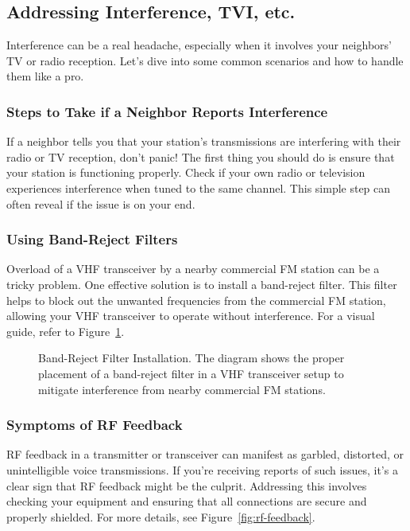 \subsection{Addressing Interference, TVI, etc.}
\label{subsec:interference}

Interference can be a real headache, especially when it involves your neighbors' TV or radio reception. Let's dive into some common scenarios and how to handle them like a pro.

\subsubsection*{Steps to Take if a Neighbor Reports Interference}

If a neighbor tells you that your station's transmissions are interfering with their radio or TV reception, don't panic! The first thing you should do is ensure that your station is functioning properly. Check if your own radio or television experiences interference when tuned to the same channel. This simple step can often reveal if the issue is on your end.

\subsubsection*{Using Band-Reject Filters}

Overload of a VHF transceiver by a nearby commercial FM station can be a tricky problem. One effective solution is to install a band-reject filter. This filter helps to block out the unwanted frequencies from the commercial FM station, allowing your VHF transceiver to operate without interference. For a visual guide, refer to Figure~\ref{fig:band-reject}.

\begin{figure}[h]
    \centering
    \caption{Band-Reject Filter Installation. The diagram shows the proper placement of a band-reject filter in a VHF transceiver setup to mitigate interference from nearby commercial FM stations.}
    \label{fig:band-reject}
\end{figure}

\subsubsection*{Symptoms of RF Feedback}

RF feedback in a transmitter or transceiver can manifest as garbled, distorted, or unintelligible voice transmissions. If you're receiving reports of such issues, it's a clear sign that RF feedback might be the culprit. Addressing this involves checking your equipment and ensuring that all connections are secure and properly shielded. For more details, see Figure~\ref{fig:rf-feedback}.

